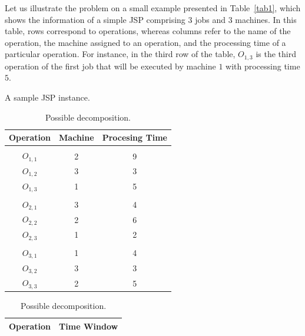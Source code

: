 \documentclass[runningheads]{llncs}
\begin{document}
Let us illustrate the problem on a small example presented in Table~\ref{tab1}, which shows the information of a simple JSP comprising $3$ jobs and $3$ machines. In this table, rows correspond to operations, whereas columns refer to the name of the operation, the machine assigned to an operation, and the processing time of a particular operation. For instance, in the third row of the table, $O_{1,3}$ is the third operation of the first job that will be executed by machine $1$ with processing time $5$. 

\begin{table}
\begin{minipage}{.6\textwidth}
\setlength{\tabcolsep}{5.0pt}
\centering
    \caption{A sample JSP instance.}
    \label{tab1}
    \begin{tabular}{c c c}
      \textbf{Operation} & \textbf{Machine} & \textbf{Procesing Time} \\
      \hline
								\\
      $O_{1,1}$  & 2  &  9  	\\
      $O_{1,2}$  & 3  &  3  	\\
      $O_{1,3}$  & 1  &  5  	\\
								\\
      $O_{2,1}$  & 3  & 4  	\\
      $O_{2,2}$  & 2  & 6  	\\
      $O_{2,3}$  & 1  & 2  	\\
								\\
      $O_{3,1}$  & 1  & 4  	\\
      $O_{3,2}$  & 3  & 3  	\\
      $O_{3,3}$  & 2  & 5  	\\
    \end{tabular}
\end{minipage}
\begin{minipage}{.4\textwidth}
  \setlength{\tabcolsep}{5.0pt}
  \centering
    \caption{Possible decomposition.}
    \label{tab2}
    \begin{tabular}{c  c }
      \textbf{Operation} & \textbf{Time Window}  \\
      \hline

\end{tabular}
\end{minipage}
\end{table}
\end{document}
